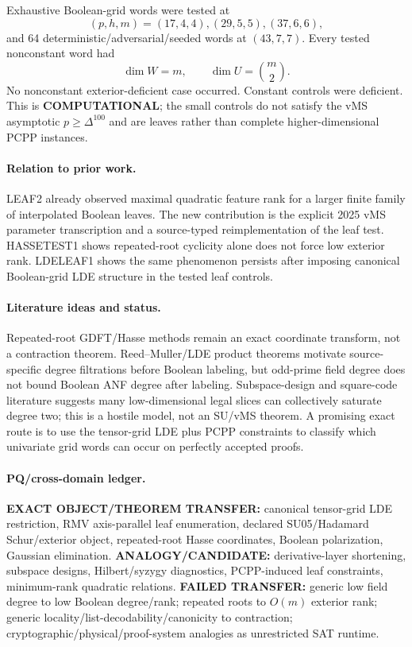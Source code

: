 \documentclass[11pt]{article}
\begin{document}
Exhaustive Boolean-grid words were tested at
\[
(p,h,m)=(17,4,4),(29,5,5),(37,6,6),
\]
and 64 deterministic/adversarial/seeded words at $(43,7,7)$. Every tested nonconstant word had
\[
\boxed{\dim W=m,\qquad \dim U=\binom m2.}
\]
No nonconstant exterior-deficient case occurred. Constant controls were deficient. This is \textbf{COMPUTATIONAL}; the small controls do not satisfy the vMS asymptotic $p\ge\Delta^{100}$ and are leaves rather than complete higher-dimensional PCPP instances.

\paragraph{Relation to prior work.}
LEAF2 already observed maximal quadratic feature rank for a larger finite family of interpolated Boolean leaves. The new contribution is the explicit 2025 vMS parameter transcription and a source-typed reimplementation of the leaf test. HASSETEST1 shows repeated-root cyclicity alone does not force low exterior rank. LDELEAF1 shows the same phenomenon persists after imposing canonical Boolean-grid LDE structure in the tested leaf controls.

\paragraph{Literature ideas and status.}
Repeated-root GDFT/Hasse methods remain an exact coordinate transform, not a contraction theorem. Reed--Muller/LDE product theorems motivate source-specific degree filtrations before Boolean labeling, but odd-prime field degree does not bound Boolean ANF degree after labeling. Subspace-design and square-code literature suggests many low-dimensional legal slices can collectively saturate degree two; this is a hostile model, not an SU/vMS theorem. A promising exact route is to use the tensor-grid LDE plus PCPP constraints to classify which univariate grid words can occur on perfectly accepted proofs.

\paragraph{PQ/cross-domain ledger.}
\textbf{EXACT OBJECT/THEOREM TRANSFER:} canonical tensor-grid LDE restriction, RMV axis-parallel leaf enumeration, declared SU05/Hadamard Schur/exterior object, repeated-root Hasse coordinates, Boolean polarization, Gaussian elimination.
\textbf{ANALOGY/CANDIDATE:} derivative-layer shortening, subspace designs, Hilbert/syzygy diagnostics, PCPP-induced leaf constraints, minimum-rank quadratic relations.
\textbf{FAILED TRANSFER:} generic low field degree to low Boolean degree/rank; repeated roots to $O(m)$ exterior rank; generic locality/list-decodability/canonicity to contraction; cryptographic/physical/proof-system analogies as unrestricted SAT runtime.
\end{document}
